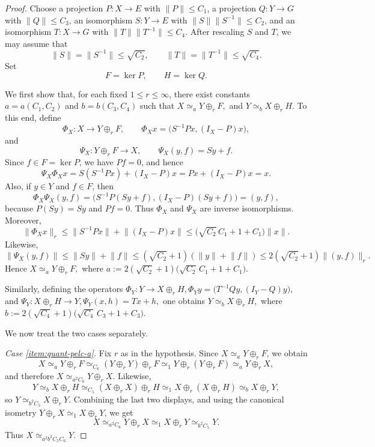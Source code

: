 \documentclass[10pt,a4paper]{amsart}
\renewcommand{\le}{\leqslant}
\newcommand{\norm}[1]{\lVert #1 \rVert}
\begin{document}
\begin{proof}
Choose a projection $P \colon X \to E$ with $\norm{P} \le C_1$, a projection $Q \colon Y \to G$ with $\norm{Q} \le C_3$, an isomorphism $S \colon Y \to E$ with $\norm{S}\norm{S^{-1}} \le C_2$, and an isomorphism $T \colon X \to G$ with $\norm{T}\norm{T^{-1}} \le C_4$.
After rescaling $S$ and $T$, we may assume that
\[
    \norm{S}=\norm{S^{-1}} \le \sqrt{C_2},
    \qquad
    \norm{T}=\norm{T^{-1}} \le \sqrt{C_4}.
\]
Set
\[
    F = \ker P,
    \qquad
    H = \ker Q.
\]

We first show that, for each fixed $1 \le r \le \infty$, there exist constants $a=a(C_1,C_2)$ and $b=b(C_3,C_4)$ such that
\(
    X \simeq_a Y \oplus_r F,
\)
and
\(
    Y \simeq_b X \oplus_r H.
\)
To this end, define
\[
    \Phi_X \colon X \to Y \oplus_r F,
    \qquad
    \Phi_X x = \bigl(S^{-1}Px,(I_X-P)x\bigr),
\]
and
\[
    \Psi_X \colon Y \oplus_r F \to X,
    \qquad
    \Psi_X(y,f)=Sy+f.
\]
Since $f \in F=\ker P$, we have $Pf=0$, and hence
\[
    \Psi_X\Phi_X x = S(S^{-1}Px)+(I_X-P)x = Px+(I_X-P)x = x.
\]
Also, if $y \in Y$ and $f \in F$, then
\[
    \Phi_X\Psi_X(y,f)=\bigl(S^{-1}P(Sy+f),(I_X-P)(Sy+f)\bigr)=(y,f),
\]
because $P(Sy)=Sy$ and $Pf=0$.
Thus $\Phi_X$ and $\Psi_X$ are inverse isomorphisms. Moreover,
\[
    \norm{\Phi_X x}_r \le \norm{S^{-1}Px}+\norm{(I_X-P)x}
    \le \bigl(\sqrt{C_2}\,C_1+1+C_1\bigr)\norm{x}.
\]
Likewise,
\[
    \norm{\Psi_X(y,f)} \le \norm{Sy}+\norm{f}
    \le (\sqrt{C_2}+1)(\norm{y}+\norm{f})
    \le 2(\sqrt{C_2}+1)\norm{(y,f)}_r.
\]
Hence
\(
    X \simeq_a Y \oplus_r F,
\)
where
\(
    a := 2(\sqrt{C_2}+1)\bigl(\sqrt{C_2}\,C_1+1+C_1\bigr).
\)

Similarly, defining the operators 
\(
    \Phi_Y \colon Y \to X \oplus_r H, 
    \Phi_Y y = \bigl(T^{-1}Qy,(I_Y-Q)y\bigr),
\)
and
\(
    \Psi_Y \colon X \oplus_r H \to Y, 
    \Psi_Y(x,h)=Tx+h,
\)
one obtains
\(
    Y \simeq_b X \oplus_r H,
\)
where
\(
    b := 2(\sqrt{C_4}+1)\bigl(\sqrt{C_4}\,C_3+1+C_3\bigr).
\)

We now treat the two cases separately.

\smallskip
\noindent
\textit{Case \ref{item:quant-pelc-a}.}
Fix $r$ as in the hypothesis.
Since $X \simeq_a Y \oplus_r F$, we obtain
\[
    X \simeq_a Y \oplus_r F
    \simeq_{C_6} (Y \oplus_r Y)\oplus_r F
    \simeq_1 Y \oplus_r (Y \oplus_r F)
    \simeq_a Y \oplus_r X,
\]
and therefore
\(
    X \simeq_{a^2C_6} Y \oplus_r X.
\)
Likewise,
\[
    Y \simeq_b X \oplus_r H
    \simeq_{C_5} (X \oplus_r X)\oplus_r H
    \simeq_1 X \oplus_r (X \oplus_r H)
    \simeq_b X \oplus_r Y,
\]
so
\(
    Y \simeq_{b^2C_5} X \oplus_r Y.
\)
Combining the last two displays, and using the canonical isometry $Y \oplus_r X \simeq_1 X \oplus_r Y$, we get
\[
    X \simeq_{a^2C_6} Y \oplus_r X
    \simeq_1 X \oplus_r Y
    \simeq_{b^2C_5} Y.
\]
Thus
\(
    X \simeq_{a^2b^2C_5C_6} Y.
\)


\end{proof}
\end{document}
